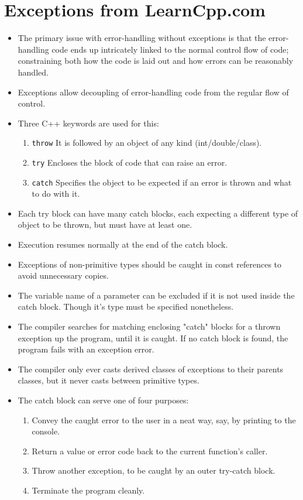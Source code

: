 \documentclass{report}
\begin{document}
\section{Exceptions from LearnCpp.com}
\begin{itemize}
\item The primary issue with error-handling without exceptions is that
the error-handling code ends up intricately linked to the normal control
flow of code; constraining both how the code is laid out and how errors can 
be reasonably handled.
\item Exceptions allow decoupling of error-handling code from the regular flow of control.
\item Three C++ keywords are used for this:
\begin{enumerate}
\item \texttt{throw} It is followed by an object of any kind (int/double/class).
\item \texttt{try} Encloses the block of code that can raise an error.
\item \texttt{catch} Specifies the object to be expected if an error is thrown and what to do with it.
\end{enumerate}
\item Each try block can have many catch blocks, each expecting a different 
type of object to be thrown, but must have at least one.
\item Execution resumes normally at the end of the catch block.
\item Exceptions of non-primitive types should be caught in const references to avoid unnecessary copies.
\item The variable name of a parameter can be excluded if it is not used inside the catch block.
Though it's type must be specified nonetheless.
\item The compiler searches for matching enclosing "catch" blocks for a thrown exception up the program,
until it is caught. If no catch block is found, the program fails with an exception error.
\item The compiler only ever casts derived classes of exceptions to their parents classes, but it never
casts between primitive types.
\item The catch block can serve one of four purposes:
\begin{enumerate}
\item Convey the caught error to the user in a neat way, say, by printing to the console.
\item Return a value or error code back to the current function's caller.
\item Throw another exception, to be caught by an outer try-catch block.
\item Terminate the program cleanly.
\end{enumerate}
\end{itemize}
\end{document}
